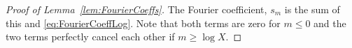 \documentclass[10pt,a4paper]{amsart}
\begin{document}
\begin{proof}[Proof of Lemma~\ref{lem:FourierCoeffs}]
The Fourier coefficient, $s_m$ is the sum of this and \eqref{eq:FourierCoeffLog}. Note that both terms are zero for $m\leq 0$ and the two terms perfectly cancel each other if $m\geq \log X$.
\end{proof}
\end{document}
